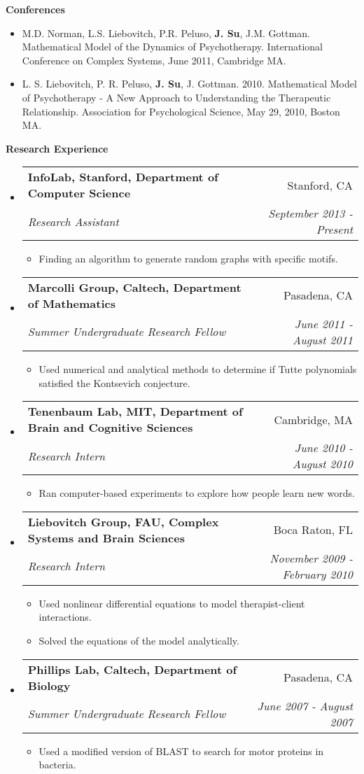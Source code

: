 \documentclass[letterpaper,11pt]{article}
\makeatletter
\newcommand{\resitem}[1]{\item #1 \vspace{-2pt}}
\newcommand{\resheading}[1]{{\large \colorbox{mygrey}{\begin{minipage}{\textwidth}{\textbf{#1 \vphantom{p\^{E}}}}\end{minipage}}}}
\newcommand{\ressubheading}[4]{
\begin{tabular*}{7.0in}{l@{\extracolsep{\fill}}r}
		\textbf{#1} & #2 \\
		\textit{#3} & \textit{#4} \\
\end{tabular*}\vspace{-6pt}}
\makeatother
\begin{document}
\resheading{Conferences}
\begin{itemize}
	\item M.D. Norman, L.S. Liebovitch, P.R. Peluso, \textbf{J. Su}, J.M. Gottman.  Mathematical Model of the Dynamics of Psychotherapy.  International Conference on Complex Systems, June 2011, Cambridge MA.
	\item L. S. Liebovitch, P. R. Peluso, \textbf{J. Su}, J. Gottman. 2010. Mathematical Model of Psychotherapy - A New Approach to Understanding the Therapeutic Relationship. Association for Psychological Science, May 29, 2010, Boston MA.
\end{itemize}

\resheading{Research Experience}
\begin{itemize}
\item
	\ressubheading{InfoLab, Stanford, Department of Computer Science}{Stanford, CA}{Research Assistant}{September 2013 - Present}
	\begin{itemize}
		\resitem{Finding an algorithm to generate random graphs with specific motifs.}
	\end{itemize}
\item
	\ressubheading{Marcolli Group, Caltech, Department of Mathematics}{Pasadena, CA}{Summer Undergraduate Research Fellow}{June 2011 - August 2011}
	\begin{itemize}
		\resitem{Used numerical and analytical methods to determine if Tutte polynomials satisfied the Kontsevich conjecture.}
	\end{itemize}
	
\item
	\ressubheading{Tenenbaum Lab, MIT, Department of Brain and Cognitive Sciences}{Cambridge, MA}{Research Intern}{June 2010 - August 2010}
	\begin{itemize}
		\resitem{Ran computer-based experiments to explore how people learn new words.}
	\end{itemize}
	

\item
	\ressubheading{Liebovitch Group, FAU, Complex Systems and Brain Sciences}{Boca Raton, FL}{Research Intern}{November 2009 - February 2010}
	\begin{itemize}
		\resitem{Used nonlinear differential equations to model therapist-client interactions.}
		\resitem{Solved the equations of the model analytically.}
	\end{itemize}


\item
	\ressubheading{Phillips Lab, Caltech, Department of Biology}{Pasadena, CA}{Summer Undergraduate Research Fellow}{June 2007 - August 2007}
	\begin{itemize}
		\resitem{Used a modified version of BLAST to search for motor proteins in bacteria.}
	\end{itemize}


\end{itemize}
\end{document}
